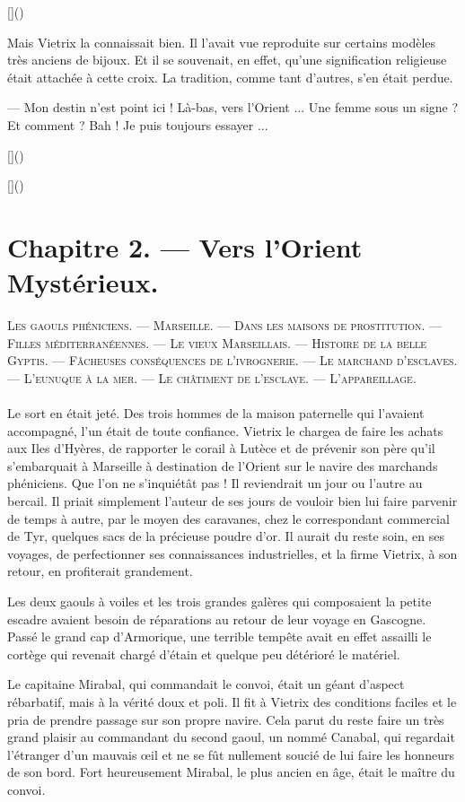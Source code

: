 \documentclass[a4paper, 11pt, oneside, polutonikogreek, french]{article}
\begin{document}
[]()

Mais Vietrix la connaissait bien. Il l'avait vue reproduite sur certains modèles très anciens de bijoux. Et il se souvenait, en effet, qu'une signification religieuse était attachée à cette croix. La tradition, comme tant d'autres, s'en était perdue.

--- Mon destin n'est point ici ! Là-bas, vers l'Orient ... Une femme sous un signe ? Et comment ? Bah ! Je puis toujours essayer ...

[]()

[]()
\clearpage
\section{Chapitre 2. --- Vers l'Orient Mystérieux.}
\begin{center}
\scshape
\small
Les gaouls phéniciens. --- Marseille. --- Dans les maisons de prostitution. --- Filles méditerranéennes. --- Le vieux Marseillais. --- Histoire de la belle Gyptis. --- Fâcheuses conséquences de l'ivrognerie. --- Le marchand d'esclaves. --- L'eunuque à la mer. --- Le châtiment de l'esclave. --- L'appareillage.
\end{center}
\paragraph{}
Le sort en était jeté. Des trois hommes de la maison paternelle qui l'avaient accompagné, l'un était de toute confiance. Vietrix le chargea de faire les achats aux Iles d'Hyères, de rapporter le corail à Lutèce et de prévenir son père qu'il s'embarquait à Marseille à destination de l'Orient sur le navire des marchands phéniciens. Que l'on ne s'inquiétât pas ! Il reviendrait un jour ou l'autre au bercail. Il priait simplement l'auteur de ses jours de vouloir bien lui faire parvenir de temps à autre, par le moyen des caravanes, chez le correspondant commercial de Tyr, quelques sacs de la précieuse poudre d'or. Il aurait du reste soin, en ses voyages, de perfectionner ses connaissances industrielles, et la firme Vietrix, à son retour, en profiterait grandement.

Les deux gaouls à voiles et les trois grandes galères qui composaient la petite escadre avaient besoin de réparations au retour de leur voyage en Gascogne. Passé le grand cap d'Armorique, une terrible tempête avait en effet assailli le cortège qui revenait chargé d'étain et quelque peu détérioré le matériel.

Le capitaine Mirabal, qui commandait le convoi, était un géant d'aspect rébarbatif, mais à la vérité doux et poli. Il fit à Vietrix des conditions faciles et le pria de prendre passage sur son propre navire. Cela parut du reste faire un très grand plaisir au commandant du second gaoul, un nommé Canabal, qui regardait l'étranger d'un mauvais œil et ne se fût nullement soucié de lui faire les honneurs de son bord. Fort heureusement Mirabal, le plus ancien en âge, était le maître du convoi.
\end{document}
